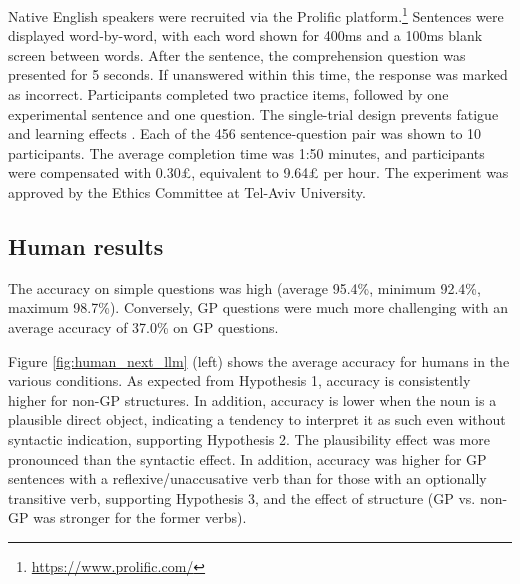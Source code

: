 Native English speakers were recruited via the Prolific platform.\footnote{\url{https://www.prolific.com/}}  Sentences were displayed word-by-word, with each word shown for 400ms and a 100ms blank screen between words. After the sentence, the comprehension question was presented for 5 seconds. If unanswered within this time, the response was marked as incorrect. Participants completed two practice items, followed by one experimental sentence and one question. The single-trial design prevents fatigue \cite{christianson2022if} and learning effects \cite{fine2013rapid}. Each of the 456 sentence-question pair was shown to 10 participants. The average completion time was 1:50 minutes, and participants were compensated with 0.30£, equivalent to 9.64£ per hour. 
The experiment was approved by the Ethics Committee at Tel-Aviv University. 


\subsection{Human results}

The accuracy on simple questions was high (average 95.4\%, minimum 92.4\%, maximum 98.7\%).
Conversely, GP questions were much more challenging with an average accuracy of 37.0\% on GP questions.

Figure \ref{fig:human_next_llm} (left) shows the average accuracy for humans in the various conditions. As expected from Hypothesis 1, accuracy is consistently higher for non-GP structures. In addition, accuracy is lower when the noun is a plausible direct object, indicating a tendency to interpret it as such even without syntactic indication, supporting Hypothesis 2. The plausibility effect was more pronounced than the syntactic effect. In addition, accuracy was higher for GP sentences with a reflexive/unaccusative verb than for those with an optionally transitive verb, supporting Hypothesis 3, and the effect of structure (GP vs. non-GP was stronger for the former verbs). 

